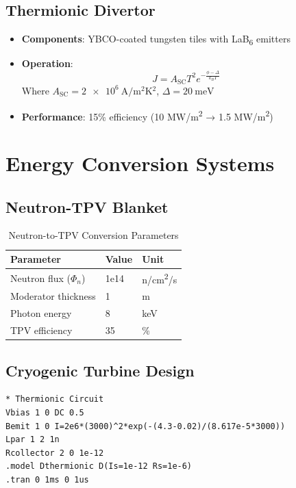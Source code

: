 \documentclass{article}
\begin{document}
\subsection{Thermionic Divertor}
\begin{itemize}
\item \textbf{Components}: YBCO-coated tungsten tiles with LaB\textsubscript{6} emitters
\item \textbf{Operation}:
\begin{equation}
J = A_{\text{SC}}T^2 e^{-\frac{\phi - \Delta}{k_B T}}
\end{equation}
Where $A_{\text{SC}} = \SI{2e6}{\ampere\per\square\meter\kelvin^2}$, $\Delta = \SI{20}{\milli\electronvolt}$
\item \textbf{Performance}: 15\% efficiency (10 MW/m\textsuperscript{2} → 1.5 MW/m\textsuperscript{2})
\end{itemize}

\section{Energy Conversion Systems}
\subsection{Neutron-TPV Blanket}
\begin{table}[ht]
\centering
\caption{Neutron-to-TPV Conversion Parameters}
\label{tab:ntpv}
\begin{tabular}{lll}
\toprule
Parameter & Value & Unit \\
\midrule
Neutron flux ($\Phi_n$) & 1e14 & n/cm\textsuperscript{2}/s \\
Moderator thickness & 1 & m \\
Photon energy & 8 & keV \\
TPV efficiency & 35 & \% \\
\bottomrule
\end{tabular}
\end{table}

\subsection{Cryogenic Turbine Design}
\begin{lstlisting}[style=spice,caption={SPICE Model for Thermionic Circuit}]
* Thermionic Circuit
Vbias 1 0 DC 0.5
Bemit 1 0 I=2e6*(3000)^2*exp(-(4.3-0.02)/(8.617e-5*3000))
Lpar 1 2 1n
Rcollector 2 0 1e-12
.model Dthermionic D(Is=1e-12 Rs=1e-6)
.tran 0 1ms 0 1us
\end{lstlisting}
\end{document}
